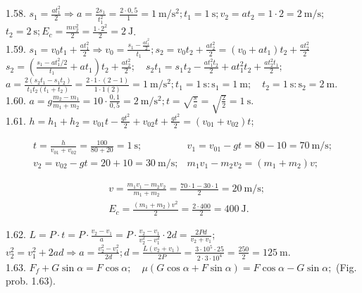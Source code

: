 1.58. $s_{1}=\frac{a t_{1}^{2}}{2} \Rightarrow a=\frac{2 s_{1}}{t_{1}^{2}}=\frac{2 \cdot 0,5}{1}=1 \mathrm{~m} / \mathrm{s}^{2} ; t_{1}=1 \mathrm{~s} ; v_{2}=a t_{2}=1 \cdot 2=2 \mathrm{~m} / \mathrm{s}$; $t_{2}=2 \mathrm{~s} ; E_{c}=\frac{m v_{2}^{2}}{2}=\frac{1 \cdot 2^{2}}{2}=2 \mathrm{~J}$.\\
1.59. $s_{1}=v_{0} t_{1}+\frac{a t_{1}^{2}}{2} \Rightarrow v_{0}=\frac{s_{1}-\frac{a t_{1}^{2}}{2}}{t_{1}} ; s_{2}=v_{0} t_{2}+\frac{a t_{2}^{2}}{2}=\left(v_{0}+a t_{1}\right) t_{2}+\frac{a t_{2}^{2}}{2}$ $s_{2}=\left(\frac{s_{1}-a t_{1}^{2} / 2}{t_{1}}+a t_{1}\right) t_{2}+\frac{a t_{2}^{2}}{2} ; \quad s_{2} t_{1}=s_{1} t_{2}-\frac{a t_{1}^{2} t_{2}}{2}+a t_{1}^{2} t_{2}+\frac{a t_{2}^{2} t_{1}}{2} ;$\\
$a=\frac{2\left(s_{2} t_{1}-s_{1} t_{2}\right)}{t_{1} t_{2}\left(t_{1}+t_{2}\right)}=\frac{2 \cdot 1 \cdot(2-1)}{1 \cdot 1(2)}=1 \mathrm{~m} / \mathrm{s}^{2} ; t_{1}=1 \mathrm{~s}: \mathrm{s}_{1}=1 \mathrm{~m} ; \quad t_{2}=1 \mathrm{~s}: \mathrm{s}_{2}=2 \mathrm{~m}$.\\
1.60. $a=g \frac{m_{2}-m_{1}}{m_{1}+m_{2}}=10 \cdot \frac{0,1}{0,5}=2 \mathrm{~m} / \mathrm{s}^{2} ; t=\sqrt{\frac{s}{a}}=\sqrt{\frac{2}{2}}=1 \mathrm{~s}$.\\
1.61. $h=h_{1}+h_{2}=v_{01} t-\frac{g t^{2}}{2}+v_{02} t+\frac{g t^{2}}{2}=\left(v_{01}+v_{02}\right) t$;

$$
\begin{array}{ll}
t=\frac{h}{v_{01}+v_{02}}=\frac{100}{80+20}=1 \mathrm{~s} ; & v_{1}=v_{01}-g t=80-10=70 \mathrm{~m} / \mathrm{s} ; \\
v_{2}=v_{02}-g t=20+10=30 \mathrm{~m} / \mathrm{s} ; & m_{1} v_{1}-m_{2} v_{2}=\left(m_{1}+m_{2}\right) v ;
\end{array}
$$

$$
\begin{aligned}
& v=\frac{m_{1} v_{1}-m_{2} v_{2}}{m_{1}+m_{2}}=\frac{70 \cdot 1-30 \cdot 1}{2}=20 \mathrm{~m} / \mathrm{s} ; \\
& E_{c}=\frac{\left(m_{1}+m_{2}\right) v^{2}}{2}=\frac{2 \cdot 400}{2}=400 \mathrm{~J} .
\end{aligned}
$$

1.62. $L=P \cdot t=P \cdot \frac{v_{2}-v_{1}}{a}=P \cdot \frac{v_{2}-v_{1}}{v_{2}^{2}-v_{1}^{2}} \cdot 2 d=\frac{2 P d}{v_{2}+v_{1}}$;\\
$v_{2}^{2}=v_{1}^{2}+2 a d \Rightarrow a=\frac{v_{2}^{2}-v_{1}^{2}}{2 d} ; d=\frac{L\left(v_{2}+v_{1}\right)}{2 P}=\frac{3 \cdot 10^{5} \cdot 25}{2 \cdot 3 \cdot 10^{4}}=\frac{250}{2}=125 \mathrm{~m}$.\\
1.63. $F_{f}+G \sin \alpha=F \cos \alpha ; \quad \mu(G \cos \alpha+F \sin \alpha)=F \cos \alpha-G \sin \alpha ;$ (Fig. prob. 1.63).

